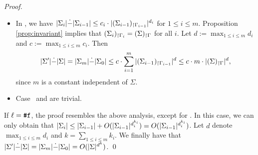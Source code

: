 \documentclass[runningheads]{llncs}
\begin{document}
\begin{proof}
\begin{itemize}
\begin{itemize}
        \begin{equation}
            \begin{aligned}
                \size{\restr{\Sigma_j[x\mapsto j]}{\Gamma[x\mapsto t]}} &= \max\{\size{j}, \size{\restr{\Sigma_j}{\Gamma[x\mapsto t]}}\} \\ &=\max\{\size{j},\size{\restr{\Sigma_{j-1}[x\mapsto j-1]}{\Gamma[x\mapsto t]}}\}\\
                &=\cdots\\
                &=\max\{\size{j},\size{\restr{\Sigma_0[x\mapsto0]}{\Gamma[x\mapsto t]}}\}\\
                &\le\max\{\size{i},\size{\restr{\Sigma}{\Gamma}}\}.
            \end{aligned}
        \end{equation}
        Then
        \begin{equation}
            \size{\Sigma'}\dot{-}\size{\Sigma} \le c \cdot (\size{\restr{\Sigma}{\Gamma}}+k)^{d+1}\le c \cdot k^{d+1} \cdot \size{\restr{\Sigma}{\Gamma}}^{d+1}.
        \end{equation}
    \end{itemize}
    \item In , we have $\vert\Sigma_i\vert\dot{-}\vert\Sigma_{i-1}\vert\le c_i \cdot \vert{(\Sigma_{i-1})_{\restriction \Gamma_{i-1}}}\vert^{d_i}$ for $1\le i\le m$.
    Proposition \ref{prop:invariant} implies that ${(\Sigma_{i})_{\restriction \Gamma_i}}={(\Sigma)_{\restriction \Gamma}}$ for all $i$.
    Let $d:=\max_{1\le i\le m}d_i$ and $c := \max_{1 \le i \le m} c_i$.
    Then
    \begin{equation}
        \vert\Sigma'\vert\dot{-}\vert\Sigma\vert =\vert\Sigma_m\vert\dot{-}\vert\Sigma_{0}\vert\le c \cdot \sum_{i=1}^{m} \vert{(\Sigma_{i-1})_{\restriction \Gamma_{i-1}}}\vert^{d}\le c \cdot m \cdot \vert{(\Sigma)_{\restriction \Gamma}}\vert^{d},
    \end{equation}
    since $m$ is a constant independent of $\Sigma$.
    \item Case~ and  are trivial.
\end{itemize}
If $\ell=\texttt{\#}\mathtt{f}$, the proof resembles the above analysis, except for .
In this case, we can only obtain that $\vert\Sigma_i\vert\le\vert\Sigma_{i-1}\vert+O(\vert\Sigma_{i-1}\vert^{d_i^{k_i}})=O(\vert\Sigma_{i-1}\vert^{d_i^{k_i}})$.
Let $d$ denote $\max_{1\le i\le m}d_i$ and $k=\sum_{1\le i\le m}k_i$.
We finally have that $\vert\Sigma'\vert\dot{-}\vert\Sigma\vert=\vert\Sigma_m\vert\dot{-}\vert\Sigma_0\vert=O(\vert\Sigma\vert^{d^{k}})$.
\qed
\end{proof}
\end{document}
